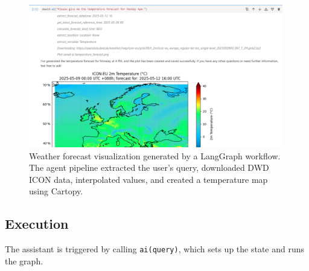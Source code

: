%
\begin{figure}[htpb]
\centering
\includegraphics[width=0.99\textwidth]{images/langgraph_weather_forecast.png}
\caption{Weather forecast visualization generated by a LangGraph workflow. The agent pipeline extracted the user's query, downloaded DWD ICON data, interpolated values, and created a temperature map using Cartopy.}
\label{fig:langgraph-weather-forecast}
\end{figure}

%
\subsection*{Execution}
The assistant is triggered by calling \texttt{ai(query)}, which sets up the state and runs the graph.


